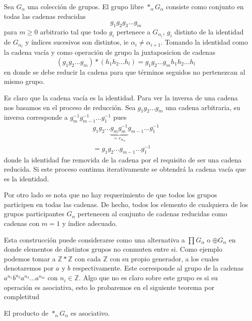 \begin{definicion}
  Sea \(G_\alpha\) una colección de grupos. El grupo libre \(*_\alpha
  G_\alpha \) consiste como conjunto en todas las cadenas reducidas
  \[ g_1 g_2 g_3 \dots g_m \]
  para \(m \geq 0\) arbitrario tal que todo \(g_i\) pertenece a
  \(G_{\alpha_i}\), \(g_i\) distinto de la identidad de
  \(G_{\alpha_i}\) y índices sucesivos son distintos, ie \(\alpha_i \neq
  \alpha_{i + 1}\). Tomando la identidad como la cadena vacía y como
  operación de grupo la juxtaposicion de cadenas
  \[ (g_1 g_2 \dots g_m ) * (h_1 h_2 \dots h_l) = g_1 g_2 \dots g_m
    h_1 h_2 \dots h_l \]
  en donde se debe reducir la cadena para que términos seguidos no
  pertenezcan al mismo grupo.
\end{definicion}
\begin{acotacion}
  Es claro que la cadena vacía es la identidad. Para ver la inversa de
  una cadena nos basamos en el proceso de reducción. Sea \(g_1 g_2 \dots
  g_m\) una cadena arbitraria, su inversa corresponde a \(g_m^{-1} g_{m-1}^{-1}
  \dots g_1^{-1}\) pues
  \begin{gather*}
    g_1 g_2 \dots \underbrace{g_m g_m^{-1}}_{= e_{\alpha_m}}
      g_{m-1} \dots g_1^{-1} \\
    = g_1 g_2 \dots g_{m-1} \dots g_1^{-1}
  \end{gather*}
  donde la identidad fue removida de la cadena por el requisito de ser
  una cadena reducida. Si este proceso continua iterativamente se
  obtendrá la cadena vacía que es la identidad.

  Por otro lado se nota que no hay requerimiento de que todos los grupos
  participen en todas las cadenas. De hecho, todos los elemento de
  cualquiera de los grupos participantes \(G_\alpha\) pertenecen al
  conjunto de cadenas reducidas como cadenas con \(m = 1\) y índice
  adecuado.
\end{acotacion}
Esta construcción puede considerarse como una alternativa a \(\prod
G_\alpha\) o \(\oplus G_\alpha\) en donde elementos de distintos grupos
no conmuten entre si. Como ejemplo podemos tomar a \(\mathbb Z * \mathbb
Z\) con cada \(\mathbb Z\) con su propio generador, a los cuales
denotaremos por \(a\) y \(b\) respectivamente. Este corresponde al grupo
de la cadenas \(a^{n_1} b^{n_2} a^{n_3} \dots a^{n_m}\) con \(n_i \in
\mathbb Z \). Algo que no es claro sobre este grupo es si
su operación es asociativa, esto lo probaremos en el siguiente teorema
por completitud
\begin{teorema}
  El producto de \(*_\alpha G_\alpha\) es asociativo.
\end{teorema}
